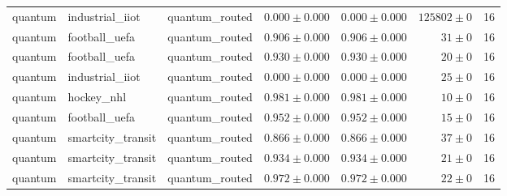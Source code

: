 \begin{table}[htbp]
\begin{tabular}{l l l r r r r}
quantum & industrial\_iiot & quantum\_routed & $0.000\pm0.000$ & $0.000\pm0.000$ & $125802\pm0$ & 16 \\
quantum & football\_uefa & quantum\_routed & $0.906\pm0.000$ & $0.906\pm0.000$ & $31\pm0$ & 16 \\
quantum & football\_uefa & quantum\_routed & $0.930\pm0.000$ & $0.930\pm0.000$ & $20\pm0$ & 16 \\
quantum & industrial\_iiot & quantum\_routed & $0.000\pm0.000$ & $0.000\pm0.000$ & $25\pm0$ & 16 \\
quantum & hockey\_nhl & quantum\_routed & $0.981\pm0.000$ & $0.981\pm0.000$ & $10\pm0$ & 16 \\
quantum & football\_uefa & quantum\_routed & $0.952\pm0.000$ & $0.952\pm0.000$ & $15\pm0$ & 16 \\
quantum & smartcity\_transit & quantum\_routed & $0.866\pm0.000$ & $0.866\pm0.000$ & $37\pm0$ & 16 \\
quantum & smartcity\_transit & quantum\_routed & $0.934\pm0.000$ & $0.934\pm0.000$ & $21\pm0$ & 16 \\
quantum & smartcity\_transit & quantum\_routed & $0.972\pm0.000$ & $0.972\pm0.000$ & $22\pm0$ & 16 \\
\hline
\end{tabular}
\end{table}
